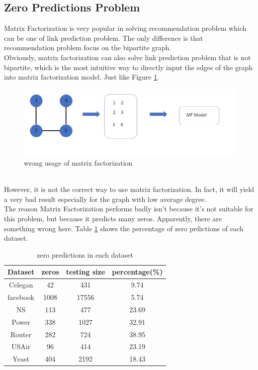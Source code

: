 \documentclass[12pt]{article}
\begin{document}
\subsection{Zero Predictions Problem}
Matrix Factorization is very popular in solving recommendation problem which can be one of link prediction problem. The only difference is that recommendation problem focus on the bipartite graph. 
\\
Obviously, matrix factorization can also solve link prediction problem that is not bipartite, which is the most intuitive way to directly input the edges of the graph into matrix factorization model. Just like Figure \ref{fig:wrong_mf}. 
\begin{figure}[h]
	\centering
	\includegraphics[scale=0.5]{wrong_mf_example}
	\caption{wrong usage of matrix factorization}
	\label{fig:wrong_mf}
\end{figure}
\\
However, it is not the correct way to use matrix factorization. In fact, it will yield a very bad result especially for the graph with low average degree. 
\\
The reason Matrix Factorization performs badly isn't because it's not suitable for this problem, but because it predicts many zeros. Apparently, there are something wrong here. Table \ref{tab:zero} shows the percentage of zero prdictions of each dataset. 
\\
\begin{table}
	\begin{center}
		\begin{tabular}{|c|c|c|c|}
			\hline
			Dataset & zeros & testing size & percentage(\%) \\
			\hline
			Celegan&42&431&9.74 \\
			facebook&1008&17556&5.74 \\
			NS&113&477&23.69 \\
			Power&338&1027&32.91 \\
			Router&282&724&38.95 \\
			USAir&96&414&23.19 \\
			Yeast&404&2192&18.43 \\
			\hline
		\end{tabular}
	\end{center}
	\caption{zero predictions in each dataset}
	\label{tab:zero}
\end{table}
\end{document}
